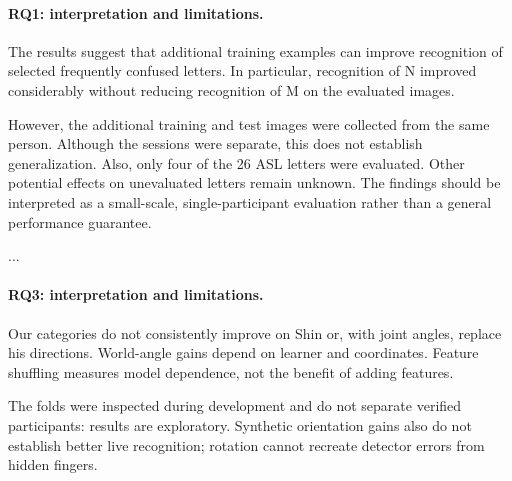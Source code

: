 \fi
\paragraph{RQ1: interpretation and limitations.}
The results suggest that additional training examples can improve recognition of selected frequently confused letters. In particular, recognition of N improved considerably without reducing recognition of M on the evaluated images. 

However, the additional training and test images were collected from the same person. Although the sessions were separate, this does not establish generalization. Also, only four of the 26 ASL letters were evaluated. Other potential effects on unevaluated letters remain unknown. The findings should be interpreted as a small-scale, single-participant evaluation rather than a general performance guarantee.
\par\noindent ...\par\medskip
\paragraph{RQ3: interpretation and limitations.}
Our categories do not consistently improve on Shin or, with joint angles, replace his directions. World-angle gains depend on learner and coordinates. Feature shuffling measures model dependence, not the benefit of adding features.

The folds were inspected during development and do not separate verified participants: results are exploratory. Synthetic orientation gains also do not establish better live recognition; rotation cannot recreate detector errors from hidden fingers.


